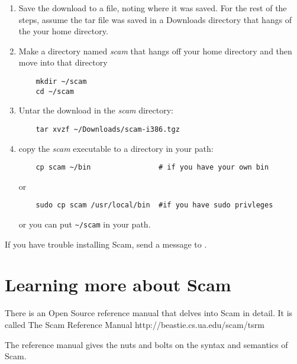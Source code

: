 \documentclass{article}
\begin{document}
\begin{enumerate}

    \item
        Save the download to a file, noting where it was saved. For the rest 
        of the steps, assume the tar file was saved in a Downloads directory
        that hangs of the your home directory.
    \item
        Make a directory named {\it scam} that hangs off your home directory and then move into that directory


\begin{verbatim}
    mkdir ~/scam
    cd ~/scam
\end{verbatim}

    \item
        Untar the download in the {\it scam} directory:

\begin{verbatim}
    tar xvzf ~/Downloads/scam-i386.tgz
\end{verbatim}

    \item
        copy the {\it scam} executable to a directory in your path:

\begin{verbatim}
    cp scam ~/bin                # if you have your own bin
\end{verbatim}

or

\begin{verbatim}
    sudo cp scam /usr/local/bin  #if you have sudo privleges
\end{verbatim}

or you can put \verb!~/scam! in your path.

\end{enumerate}

If you have trouble installing Scam, send a message to 
.

\section*{Learning more about Scam}

There is an Open Source
reference manual that delves into Scam in detail.
It is called 
\xlink
    {The Scam Reference Manual}
    {http://beastie.cs.ua.edu/scam/tsrm}

The reference manual gives the nuts and bolts on the syntax
and semantics of Scam.
\end{document}

